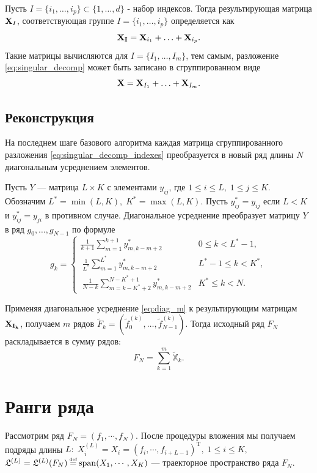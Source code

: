 \documentclass[specialist, substylefile = spbu.rtx,
			   subf, href, 12pt]{disser}
\newcommand\eqdef{\mathrel{\stackrel{\makebox[0pt]{\mbox{\normalfont\tiny def}}}{=}}}
\begin{document}
Пусть $I = \{i_1, \dotsc, i_p\} \subset \{1, \dotsc, d\}$ - набор индексов. Тогда результирующая матрица $\bold{X}_I$, соответствующая группе $I = \{i_1, \dotsc, i_p\}$ определяется как 
$$\bold{X_I} = \bold{X}_{i_1} + \dotsc + \bold{X}_{i_p}.$$
Такие матрицы вычисляются для $I = \{I_1, \dotsc, I_m\}$, тем самым, разложение \eqref{eq:singular_decomp} может быть записано в сгруппированном виде
\begin{equation}\label{eq:singular_decomp_indexes}
	\bold{X} = \bold{X}_{I_1} + \dotsc + \bold{X}_{I_m}.
\end{equation}

\subsection{Реконструкция}

На последнем шаге базового алгоритма каждая матрица сгруппированного разложения \eqref{eq:singular_decomp_indexes} преобразуется в новый ряд длины $ N $ диагональным усреднением элементов.

Пусть $Y$ --- матрица $L \times K$ с элементами $y_{ij}$, где $1 \leq i \leq L,\; 1 \leq j \leq K$. Обозначим $L^* = \min(L, K), \; K^* = \max(L, K)$. Пусть $y_{ij}^* = y_{ij}$ если $L<K$ и $y_{ij}^* = y_{ji}$ в противном случае. Диагональное усреднение преобразует матрицу $Y$ в ряд $g_0, \dotsc, g_{N-1}$ по формуле
\begin{equation}\label{eq:diag_m}
	g_k = 
	\begin{cases}
		\frac{1}{k+1}\sum\limits_{m=1}^{k+1}y_{m, k-m+2}^* & 0 \leq k < L^* -1, \\\
		\frac{1}{L^*}\sum\limits_{m=1}^{L^*}y_{m, k-m+2}^* & L^* - 1 \leq k < K^*, \\\
		\frac{1}{N-k}\sum\limits_{m=k - K^* + 2}^{N - K^* + 1}y_{m, k-m+2}^* & K^* \leq k < N.
	\end{cases}
\end{equation}

Применяя диагональное усреднение \eqref{eq:diag_m} к результирующим матрицам $\bold{X_{I_k}}$, получаем $m$ рядов $\widetilde{F}_{k} = (\widetilde{f}_0^{(k)}, \dotsc, \widetilde{f}_{N-1}^{(k)})$. Тогда исходный ряд $F_N$ раскладывается в сумму рядов:
$$F_N = \sum\limits_{k=1}^{m}\widetilde{\mathbb{X}}_k.$$

\section{Ранги ряда}
Рассмотрим ряд $F_N = (f_1,\cdots,f_N)$. После процедуры вложения мы получаем подряды длины $L:\; X_i^{(L)} = X_i = (f_{i}, \cdots, f_{i+L-1})^\mathrm{T}, \; 1 \leq i \leq K,$ $\mathfrak{L}^{(L)} = \mathfrak{L}^{(L)}(F_N) \eqdef \mathrm{span}(X_1, \cdots, X_K)$ --- траекторное пространство ряда $F_N$.
\end{document}
